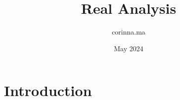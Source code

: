 \documentclass{article}
\title{Real Analysis}
\author{corinna.ma }
\date{May 2024}
\begin{document}
\maketitle

\section{Introduction}
\end{document}
